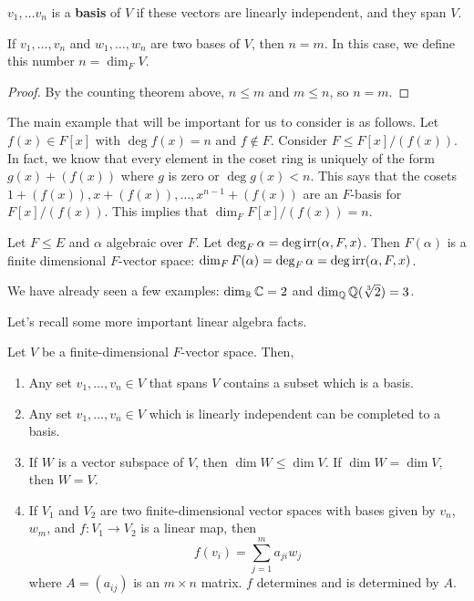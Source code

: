 \documentclass{../mathnotes}
\begin{document}
\begin{defn}
    $v_1,\ldots v_n$ is a \textbf{basis} of $V$ if these vectors are linearly independent, and they span $V$.
\end{defn}

\begin{thm}
    If $v_1,\ldots, v_n$ and $w_1,\ldots, w_n$ are two bases of $V$, then $n=m$. In this case, we define
    this number $n=\dim_F V$.
\end{thm}
\begin{proof}
    By the counting theorem above, $n\leq m$ and $m\leq n$, so $n=m$.
\end{proof}

The main example that will be important for us to consider is as follows. Let $f(x)\in F[x]$ with $\deg f(x)=n$ and $f\notin F$.
Consider $F\leq F[x]/(f(x))$. In fact, we know that every element in the coset ring is uniquely of the form
$g(x)+(f(x))$ where $g$ is zero or $\deg g(x)<n$.  This says that the cosets $1+(f(x)), x+(f(x)), \ldots, x^{n-1}+(f(x))$ are an
$F$-basis for $F[x]/(f(x))$. This implies that $\dim_F F[x]/(f(x))=n$.

\begin{cor}
    Let $F\leq E$ and $\alpha$ algebraic over $F$. Let $\deg_F\alpha=\deg\operatorname{irr}(\alpha,F,x)$.
    Then $F(\alpha)$ is a finite dimensional $F$-vector space: $\dim_F F(\alpha)=\deg_F \alpha=\deg\operatorname{irr}(\alpha,F,x)$.
\end{cor}
We have already seen a few examples: $\dim_{\mathbb{R}}\mathbb{C}=2$ and $\dim_{\mathbb{Q}}\mathbb{Q}(\sqrt[3]{2})=3$.

Let's recall some more important linear algebra facts.

\begin{thm}
    Let $V$ be a finite-dimensional $F$-vector space. Then,
    \begin{enumerate}
        \item Any set $v_1,\ldots, v_n\in V$ that spans $V$ contains a subset which is a basis.
        \item Any set $v_1, \ldots, v_n\in V$ which is linearly independent can be completed to a basis.
        \item If $W$ is a vector subspace of $V$, then $\dim W\leq \dim V$. If $\dim W=\dim V$, then $W=V$.
        \item If $V_1$ and $V_2$ are two finite-dimensional vector spaces with bases given by $v_n$, $w_m$,
            and $f:V_1\to V_2$ is a linear map, then
            \[f(v_i)=\sum_{j=1}^ma_{ji}w_j\]
            where $A=(a_{ij})$ is an $m\times n$ matrix. $f$ determines and is determined by $A$.
    \end{enumerate}
\end{thm}
\end{document}
